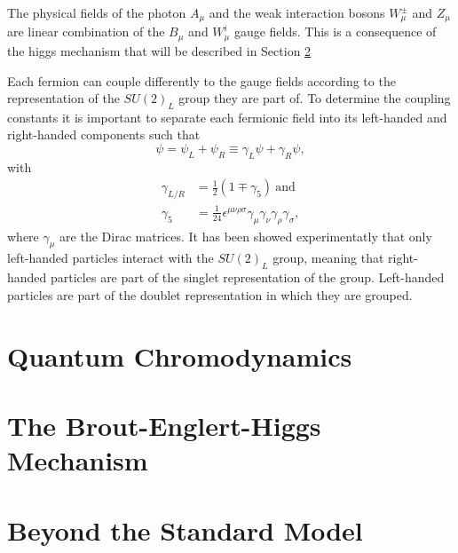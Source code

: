     The physical fields of the photon $ A_\mu $ and the weak interaction bosons $ W^\pm_\mu $ and $ Z_\mu $ are linear combination of the $ B_\mu $ and $ W^i_\mu $ gauge fields. This is a consequence of the higgs mechanism that will be described in Section \ref{sec:I-1-higgs-mechanism}

    Each fermion can couple differently to the gauge fields according to the representation of the $ SU(2)_L $ group they are part of. To determine the coupling constants it is important to separate each fermionic field into its left-handed and right-handed components such that
    \begin{equation}
      \psi = \psi_L + \psi_R \equiv \gamma_L \psi + \gamma_R \psi ,
    \end{equation}
    with
    \begin{align}
      \gamma_{L/R} & = \frac{1}{2} \left( 1 \mp \gamma_5 \right) \ \text{and} \\
      \gamma_5 & = \frac{1}{24} \epsilon^{\mu \nu \rho \sigma} \gamma_\mu \gamma_\nu \gamma_\rho \gamma_\sigma ,
    \end{align}
    where $ \gamma_\mu $ are the Dirac matrices. It has been showed experimentatly that only left-handed particles interact with the $ SU(2)_L $ group, meaning that right-handed particles are part of the singlet representation of the group. Left-handed particles are part of the doublet representation in which they are grouped.


  \section{Quantum Chromodynamics}

  \section{The Brout-Englert-Higgs Mechanism}
  \label{sec:I-1-higgs-mechanism}

  \section{Beyond the Standard Model}
